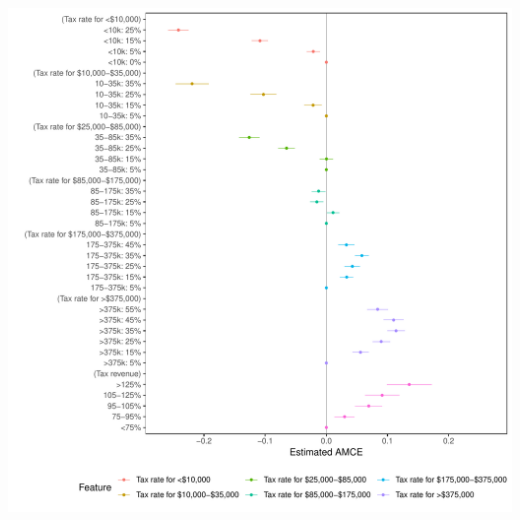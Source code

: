 \documentclass[a4paper,12pt]{article}\usepackage[]{graphicx}\usepackage[]{color}
\makeatletter
\def\maxwidth{ %
  \ifdim\Gin@nat@width>\linewidth
    \linewidth
  \else
    \Gin@nat@width
  \fi
}
\newenvironment{knitrout}{}{} %
\makeatother
\begin{document}
\begin{knitrout}
\color{fgcolor}
\includegraphics[width=\maxwidth]{figure/bms_amce_appendix-1} 

\end{knitrout}

\clearpage
\end{document}
